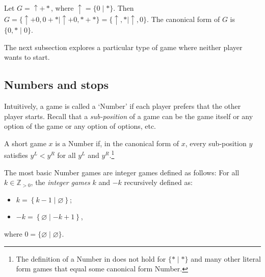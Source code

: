 \documentclass[oneside,reqno]{amsart}
\newcommand{\ur}[1]{\textcolor{blue}{#1}}
\newcommand{\an}[1]{\textcolor{red}{#1}}
\begin{document}

    \begin{example}
        Let $G = \uparrow + *$, where $\uparrow = \{0\mid *\}$. Then $ G=\{\uparrow+0, 0+*\mid \uparrow+0, *+*\} = \{\uparrow,*\mid \uparrow,0\}$. The canonical form of $G$ is $\{0,*\mid 0\}$.
    \end{example}

    The next subsection explores a particular type of game where neither player wants to start. %

\subsection{Numbers and stops}
    Intuitively, a game is called a `Number' if each player prefers that the other player starts. 
    Recall that a {\em sub-position} of a game can be the game itself or any option of the game or any option of options, etc.

    \begin{definition}[Numbers]\label{def: Number}
     A short game $x$ is a Number if, in the canonical form of $x$, every sub-position $y$ satisfies $y^L<y^R$ for all $y^L$ and $y^R$.\footnote{The definition of a Number in \cite{S2013} does not hold for $\{*\mid*\}$ and many other literal form games that equal some canonical form Number.}
    \end{definition}

    The most basic Number games are integer games defined as follows: For all \( k \in \mathbb{Z}_{>0} \), the \emph{integer games} \( k \) and \( -k \) recursively defined as: 
    \begin{itemize}
        \item $k = \left\{ k-1 \mid \varnothing \right\}$;
        \item $-k = \left\{ \varnothing \mid -k+1 \right\}$,
    \end{itemize}
    where $0 = \{\varnothing \mid \varnothing \}$. 
\end{document}

